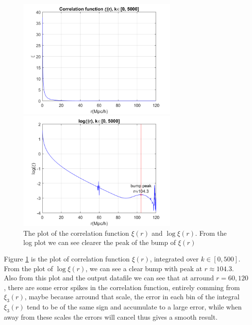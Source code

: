 \documentclass[12pt, graphicx]{article}
\begin{document}
\begin{figure}[ht]
\begin{minipage}{0.48\linewidth}
\centering
\includegraphics[width = 80mm]{xi_r_detailed.png}
\end{minipage}
\begin{minipage}{0.48\linewidth}
\centering
\includegraphics[width = 80mm]{logxi_r_detailed.png}
\end{minipage}
\caption{The plot of the correlation function $\xi(r)$ and $\log \xi(r)$. From the log plot we can see clearer the peak of the bump of $\xi(r)$}
\label{fig:xi}
\end{figure}

Figure \ref{fig:xi} is the plot of correlation function $\xi(r)$, integrated over $k\in[0,500]$. From the plot of $\log \xi(r)$, we can see a clear bump with peak at $r\approx104.3$. Also from this plot and the output datafile we can see that at arround $r=60,120$, there are some error spikes in the correlation function, entirely comming from $\xi_3(r)$, maybe because arround that scale, the error in each bin of the integral $\xi_3(r)$ tend to be of the same sign and accumulate to a large error, while when away from these scales the errors will cancel thus gives a smooth result.\par
\end{document}
